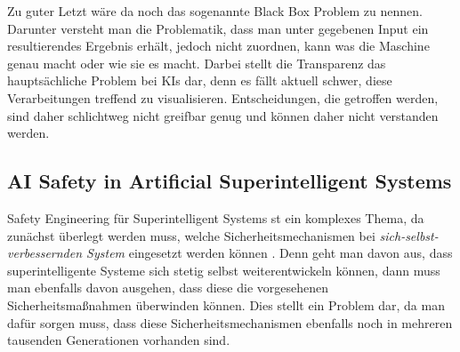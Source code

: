         Zu guter Letzt wäre da noch das sogenannte Black Box Problem zu nennen. Darunter versteht man die Problematik,
        dass man unter gegebenen Input ein resultierendes Ergebnis erhält, jedoch nicht zuordnen, kann was die Maschine
        genau macht oder wie sie es macht. \cite{zednik2019solving} Darbei stellt die Transparenz das hauptsächliche
        Problem bei KIs dar, denn es fällt aktuell schwer, diese Verarbeitungen treffend zu visualisieren. Entscheidungen,
        die getroffen werden, sind daher schlichtweg nicht greifbar genug und können daher nicht verstanden
        werden.

        \subsection{AI Safety in Artificial Superintelligent Systems}

        Safety Engineering für Superintelligent Systems st ein komplexes Thema, da zunächst überlegt werden muss, welche
        Sicherheitsmechanismen bei \textit{sich-selbst-verbessernden System} eingesetzt werden können \cite[s. 9]{yampolskiy2013safety}.
        Denn geht man davon aus, dass superintelligente Systeme sich stetig selbst weiterentwickeln können, dann muss man
        ebenfalls davon ausgehen, dass diese die vorgesehenen Sicherheitsmaßnahmen überwinden können. Dies stellt ein
        Problem dar, da man dafür sorgen muss, dass diese Sicherheitsmechanismen ebenfalls noch in mehreren tausenden
        Generationen vorhanden sind.

